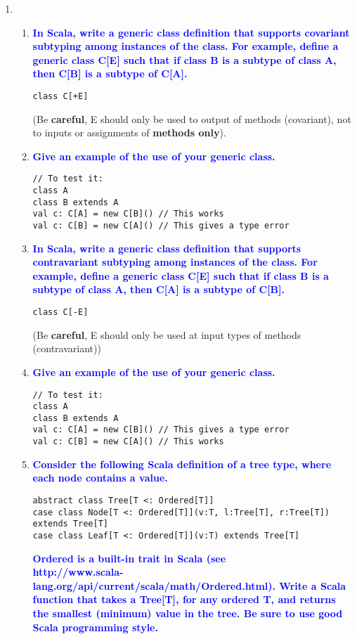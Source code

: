 \documentclass[10pt]{article}
\begin{document}
\begin{enumerate}
    
    \item
    \begin{enumerate}
        \item \textbf{\textcolor{blue}{In Scala, write a generic class definition that supports covariant subtyping among instances of the class. For example, define a generic class C[E] such that if class B is a subtype of class A, then C[B] is a subtype of C[A].}}
            \begin{verbatim}
class C[+E]
            \end{verbatim}
            (Be \textbf{careful}, E should only be used to output of methods (covariant), not to inputs or assignments of \textbf{methods only}).
        \item \textbf{\textcolor{blue}{Give an example of the use of your generic class.}}
            \begin{verbatim}
// To test it:
class A
class B extends A
val c: C[A] = new C[B]() // This works
val c: C[B] = new C[A]() // This gives a type error
            \end{verbatim}
        \item \textbf{\textcolor{blue}{In Scala, write a generic class definition that supports contravariant subtyping among instances of the class. For example, define a generic class C[E] such that if class B is a subtype of class A, then C[A] is a subtype of C[B].}}
            \begin{verbatim}
class C[-E]
            \end{verbatim}
            (Be \textbf{careful}, E should only be used at input types of methods (contravariant))
        \item \textbf{\textcolor{blue}{Give an example of the use of your generic class.}}
            \begin{verbatim}
// To test it:
class A
class B extends A
val c: C[A] = new C[B]() // This gives a type error
val c: C[B] = new C[A]() // This works
            \end{verbatim}
        \item \textbf{\textcolor{blue}{Consider the following Scala definition of a tree type, where each node contains a value.}}
        \begin{verbatim}
abstract class Tree[T <: Ordered[T]]
case class Node[T <: Ordered[T]](v:T, l:Tree[T], r:Tree[T]) extends Tree[T]
case class Leaf[T <: Ordered[T]](v:T) extends Tree[T]
        \end{verbatim}
        \textbf{\textcolor{blue}{Ordered is a built-in trait in Scala (see \\ http://www.scala-lang.org/api/current/scala/math/Ordered.html). Write a Scala function that takes a Tree[T], for any ordered T, and returns the smallest (minimum) value in the tree. Be sure to use good Scala programming style.}}

\end{enumerate}
\end{enumerate}
\end{document}
